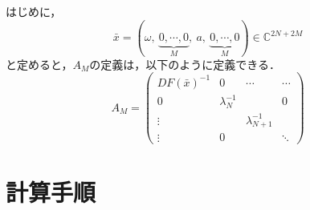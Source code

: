 \begin{dfn}
  \label{dfn:作用素A}
  はじめに，
  \begin{equation}
    \bar{x} = (\omega,\ \underbrace{0,\cdots,0}_{M},\ a,\ \underbrace{0,\cdots,0}_{M}) \in \mathbb{C}^{2N+2M}
  \end{equation}
  と定めると，$A_M$の定義は，以下のように定義できる．
  \begin{equation*}
    A_M = \left(
    \begin{array}{c|ccc}
      DF(\bar{x})^{-1} & 0 & \cdots & \cdots \\ \hline
      0 & \lambda_N^{-1} &  & 0 \\
      \vdots &  & \lambda_{N+1}^{-1} &  \\
      \vdots & 0 &   & \ddots
    \end{array}
    \right)
  \end{equation*}
\end{dfn}

\section{計算手順}

